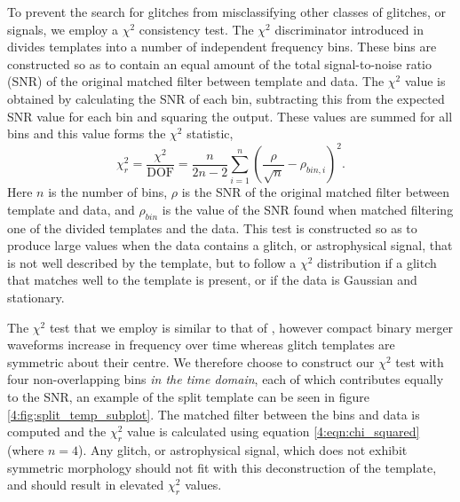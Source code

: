 To prevent the search for \scl{} glitches from misclassifying other classes of glitches, or \gw{} signals, we employ a $\chi^2$ consistency test. The $\chi^2$ discriminator introduced in \cite{Allen_Chi:2005} divides \gw{} templates into a number of independent frequency bins. These bins are constructed so as to contain an equal amount of the total signal-to-noise ratio (SNR) of the original matched filter between template and data. The $\chi^{2}$ value is obtained by calculating the SNR of each bin, subtracting this from the expected SNR value for each bin and squaring the output. These values are summed for all bins and this value forms the $\chi^{2}$ statistic,
%
\begin{equation}
  \chi_{r}^{2} = \frac{\chi^{2}}{\textrm{DOF}} = \frac{n}{2n - 2} \sum_{i=1}^n \left(\frac{\rho}{\sqrt{n}} - \rho_{bin,i}\right)^2.
  \label{4:eqn:chi_squared}
\end{equation}
%
Here $n$ is the number of bins, $\rho$ is the SNR of the original matched filter between template and data, and $\rho_{bin}$ is the value of the SNR found when matched filtering one of the divided templates and the data. This test is constructed so as to produce large values when the data contains a glitch, or astrophysical signal, that is not well described by the template, but to follow a $\chi^2$ distribution if a glitch that matches well to the template is present, or if the data is Gaussian and stationary.

The $\chi^2$ test that we employ is similar to that of \cite{Allen_Chi:2005}, however compact binary merger waveforms increase in frequency over time whereas \scl{} glitch templates are symmetric about their centre. We therefore choose to construct our $\chi^2$ test with four non-overlapping bins \emph{in the time domain}, each of which contributes equally to the SNR, an example of the split template can be seen in figure \ref{4:fig:split_temp_subplot}. The matched filter between the bins and data is computed and the $\chi_{r}^{2}$ value is calculated using equation \ref{4:eqn:chi_squared} (where $n=4$). Any glitch, or astrophysical signal, which does not exhibit symmetric morphology should not fit with this deconstruction of the template, and should result in elevated $\chi_{r}^{2}$ values.

